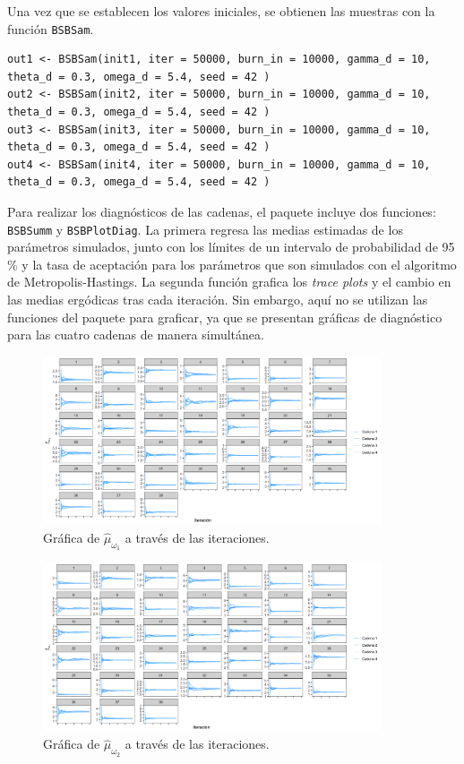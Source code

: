 \documentclass[11pt,a4paper]{article}
\begin{document}
Una vez que se establecen los valores iniciales, se obtienen las muestras con la función \texttt{BSBSam}.\\

\begin{lstlisting}
out1 <- BSBSam(init1, iter = 50000, burn_in = 10000, gamma_d = 10, theta_d = 0.3, omega_d = 5.4, seed = 42 )
out2 <- BSBSam(init2, iter = 50000, burn_in = 10000, gamma_d = 10, theta_d = 0.3, omega_d = 5.4, seed = 42 )
out3 <- BSBSam(init3, iter = 50000, burn_in = 10000, gamma_d = 10, theta_d = 0.3, omega_d = 5.4, seed = 42 )
out4 <- BSBSam(init4, iter = 50000, burn_in = 10000, gamma_d = 10, theta_d = 0.3, omega_d = 5.4, seed = 42 )
\end{lstlisting} \leavevmode\newline

Para realizar los diagnósticos de las cadenas, el paquete incluye dos funciones: \texttt{BSBSumm} y \texttt{BSBPlotDiag}. La primera regresa las medias estimadas de los parámetros simulados, junto con los límites de un intervalo de probabilidad de 95 \% y la tasa de aceptación para los parámetros que son simulados con el algoritmo de Metropolis-Hastings. La segunda función grafica los \textit{trace plots} y el cambio en las medias ergódicas tras cada iteración. Sin embargo, aquí no se utilizan las funciones del paquete para graficar, ya que se presentan gráficas de diagnóstico para las cuatro cadenas de manera simultánea.\\

\begin{figure}[!p]
\centering\includegraphics[width=10cm]{ergodic_means_omega1.png}
\caption{Gráfica de $\hat{\mu}_{\omega_1}$ a través de las iteraciones.}
\label{fig:ergodic_means_omega1}
\end{figure}

\begin{figure}[!p]
\centering\includegraphics[width=10cm]{ergodic_means_omega2.png}
\caption{Gráfica de $\hat{\mu}_{\omega_2}$ a través de las iteraciones.}
\label{fig:ergodic_means_omega2}
\end{figure}
\end{document}
